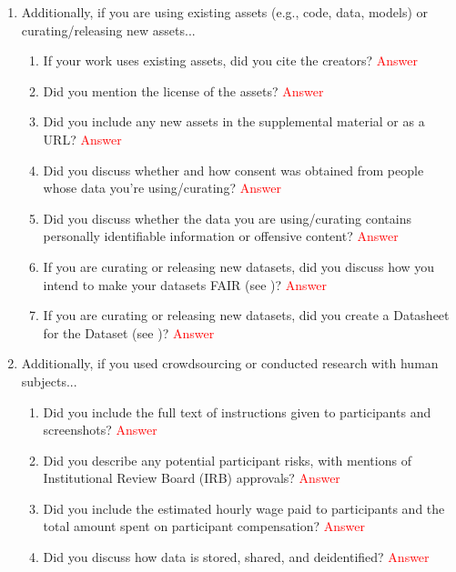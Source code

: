 \documentclass[letterpaper]{article} %
\newcommand{\answerTODO}[1]{\textcolor{red}{#1}}
\begin{document}
\begin{enumerate}
\begin{enumerate}
\end{enumerate}

\item Additionally, if you are using existing assets (e.g., code, data, models) or curating/releasing new assets...
\begin{enumerate}
  \item If your work uses existing assets, did you cite the creators?
    \answerTODO{Answer}
  \item Did you mention the license of the assets?
    \answerTODO{Answer}
  \item Did you include any new assets in the supplemental material or as a URL?
    \answerTODO{Answer}
  \item Did you discuss whether and how consent was obtained from people whose data you're using/curating?
    \answerTODO{Answer}
  \item Did you discuss whether the data you are using/curating contains personally identifiable information or offensive content?
    \answerTODO{Answer}
\item If you are curating or releasing new datasets, did you discuss how you intend to make your datasets FAIR (see \citet{fair})?
\answerTODO{Answer}
\item If you are curating or releasing new datasets, did you create a Datasheet for the Dataset (see \citet{gebru2021datasheets})? 
\answerTODO{Answer}
\end{enumerate}

\item Additionally, if you used crowdsourcing or conducted research with human subjects...
\begin{enumerate}
  \item Did you include the full text of instructions given to participants and screenshots?
    \answerTODO{Answer}
  \item Did you describe any potential participant risks, with mentions of Institutional Review Board (IRB) approvals?
    \answerTODO{Answer}
  \item Did you include the estimated hourly wage paid to participants and the total amount spent on participant compensation?
    \answerTODO{Answer}
   \item Did you discuss how data is stored, shared, and deidentified?
   \answerTODO{Answer}
\end{enumerate}

\end{enumerate}



\end{document}
